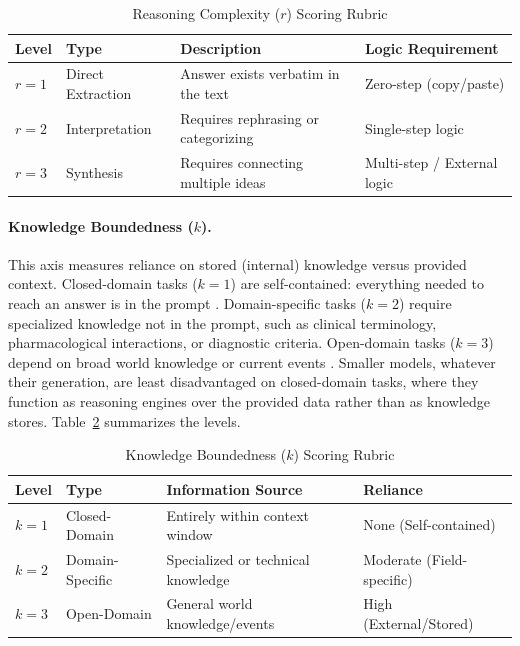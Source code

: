 \documentclass[11pt]{article}
\begin{document}
\begin{table}[ht]
  \centering
  \caption{Reasoning Complexity ($r$) Scoring Rubric}
  \label{tab:reasoning}
  \begin{tabular}{@{}llll@{}}
    \toprule
    Level & Type & Description & Logic Requirement \\
    \midrule
    $r=1$ & Direct Extraction & Answer exists verbatim in the text & Zero-step (copy/paste) \\
    $r=2$ & Interpretation & Requires rephrasing or categorizing & Single-step logic \\
    $r=3$ & Synthesis & Requires connecting multiple ideas & Multi-step / External logic \\
    \bottomrule
  \end{tabular}
\end{table}

\paragraph{Knowledge Boundedness ($k$).}
This axis measures reliance on stored (internal) knowledge versus provided context. Closed-domain tasks ($k=1$) are self-contained: everything needed to reach an answer is in the prompt \cite{Lewis2020}. Domain-specific tasks ($k=2$) require specialized knowledge not in the prompt, such as clinical terminology, pharmacological interactions, or diagnostic criteria. Open-domain tasks ($k=3$) depend on broad world knowledge or current events \cite{Mallen2023}. Smaller models, whatever their generation, are least disadvantaged on closed-domain tasks, where they function as reasoning engines over the provided data rather than as knowledge stores. Table~\ref{tab:knowledge} summarizes the levels.

\begin{table}[ht]
  \centering
  \caption{Knowledge Boundedness ($k$) Scoring Rubric}
  \label{tab:knowledge}
  \begin{tabular}{@{}llll@{}}
    \toprule
    Level & Type & Information Source & Reliance \\
    \midrule
    $k=1$ & Closed-Domain & Entirely within context window & None (Self-contained) \\
    $k=2$ & Domain-Specific & Specialized or technical knowledge & Moderate (Field-specific) \\
    $k=3$ & Open-Domain & General world knowledge/events & High (External/Stored) \\
    \bottomrule
  \end{tabular}
\end{table}
\end{document}
